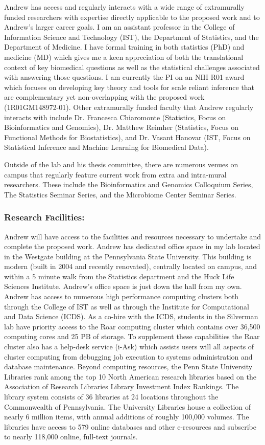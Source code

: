 \documentclass{NIHGrant}
\begin{document}
Andrew has access and regularly interacts with a wide range of extramurally
funded researchers with expertise directly applicable to the proposed work and
to Andrew's larger career goals. I am an assistant professor in the College of
Information Science and Technology (IST), the Department of Statistics, and the
Department of Medicine. I have formal training in both statistics (PhD) and
medicine (MD) which gives me a keen appreciation of both the translational
context of key biomedical questions as well as the statistical challenges
associated with answering those questions. I am currently the PI on an NIH R01
award which focuses on developing key theory and tools for scale reliant
inference that are complementary yet non-overlapping with the proposed work
(1R01GM148972-01). Other extramurally funded faculty that Andrew regularly
interacts with include Dr. Francesca Chiaromonte (Statistics, Focus on
Bioinformatics and Genomics), Dr. Matthew Reimher (Statistics, Focus on
Functional Methods for Biostatistics), and Dr. Vasant Hanovar (IST, Focus on
Statistical Inference and Machine Learning for Biomedical Data).

Outside of the lab and his thesis committee, there are numerous venues on campus
that regularly feature current work from extra and intra-mural researchers.
These include the Bioinformatics and Genomics Colloquium Series, The Statistics
Seminar Series, and the Microbiome Center Seminar Series. 


\subsubsection*{Research Facilities: }

Andrew will have access to the facilities and resources necessary to undertake
and complete the proposed work. Andrew has dedicated office space in my lab
located in the Westgate building at the Pennsylvania State University. This
building is modern (built in 2004 and recently renovated), centrally located on
campus, and within a 5 minute walk from the Statistics department and the Huck
Life Sciences Institute. Andrew's office space is just down the hall from my
own. Andrew has access to numerous high performance computing clusters both
through the College of IST as well as through the Institute for Computational
and Data Science (ICDS). As a co-hire with the ICDS, students in the Silverman
lab have priority access to the Roar computing cluster which contains over
36,500 computing cores and 25 PB of storage. To supplement these capabilities
the Roar cluster also has a help-desk service (i-Ask) which assists users will
all aspects of cluster computing from debugging job execution to systems
administration and database maintenance. Beyond computing resources, the Penn
State University Libraries rank among the top 10 North American research
libraries based on the Association of Research Libraries Library Investment
Index Rankings. The library system consists of 36 libraries at 24 locations
throughout the Commonwealth of Pennsylvania. The University Libraries house a
collection of nearly 6 million items, with annual additions of roughly 100,000
volumes. The libraries have access to 579 online databases and other e-resources
and subscribe to nearly 118,000 online, full-text journals.
\end{document}
